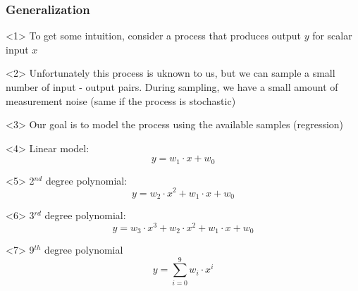 \begin{frame}
  \frametitle{Generalization}
  \begin{onlyenv}<1>
    To get some intuition, consider a process that produces output
    $y$ for scalar input $x$
    \begin{center}
      \scalebox{0.5}{
        
      }
    \end{center}
  \end{onlyenv}
  \begin{onlyenv}<2>
    Unfortunately this process is uknown to us, but we can sample a small
    number of input - output pairs. During sampling, we have a small amount of
    measurement noise (same if the process is stochastic)
    \begin{center}
      \scalebox{0.5}{
        
      }
    \end{center}
  \end{onlyenv}
  \begin{onlyenv}<3>
    Our goal is to model the process using the available samples (regression)
    \vspace{1cm}\\
  \end{onlyenv}
  \begin{onlyenv}<4>
    Linear model:
    \begin{equation*}
      y = w_1\cdot x + w_0
    \end{equation*}
    \begin{center}
      \scalebox{0.5}{
        
      }
    \end{center}
  \end{onlyenv}
  \begin{onlyenv}<5>
    2$^{nd}$ degree polynomial:
    \begin{equation*}
      y = w_2\cdot x^2 + w_1\cdot x + w_0
    \end{equation*}
    \begin{center}
      \scalebox{0.5}{
        
      }
    \end{center}
  \end{onlyenv}
  \begin{onlyenv}<6>
    3$^{rd}$ degree polynomial:
    \begin{equation*}
      y = w_3\cdot x^3 + w_2\cdot x^2 + w_1\cdot x + w_0
    \end{equation*}
    \begin{center}
      \scalebox{0.5}{
        
      }
    \end{center}
  \end{onlyenv}
  \begin{onlyenv}<7>
    9$^{th}$ degree polynomial
    \begin{equation*}
      y = \sum_{i=0}^{9}w_i\cdot x^{i}
    \end{equation*}
    \begin{center}
      \scalebox{0.5}{
        
      }
    \end{center}
  \end{onlyenv}
\end{frame}


